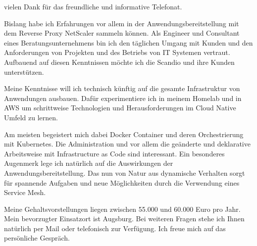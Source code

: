 \documentclass[11pt, a4paper]{awesome-cv} %
\begin{document}
\makecvheader %

\makelettertitle %


\begin{cvletter}



vielen Dank für das freundliche und informative Telefonat.

Bislang habe ich Erfahrungen vor allem in der Anwendungsbereitstellung mit dem Reverse Proxy NetScaler sammeln können. Als Engineer und Consultant eines Beratungsunternehmens bin ich den täglichen Umgang mit Kunden und den Anforderungen von Projekten und des Betriebs von IT Systemen vertraut. Aufbauend auf diesen Kenntnissen möchte ich die Scandio und ihre Kunden unterstützen.

Meine Kenntnisse will ich technisch künftig auf die gesamte Infrastruktur von Anwendungen ausbauen. Dafür experimentiere ich in meinem Homelab und in AWS um schrittweise Technologien und Herausforderungen im Cloud Native Umfeld zu lernen.

Am meisten begeistert mich dabei Docker Container und deren Orchestrierung mit Kubernetes. Die Administration und vor allem die geänderte und deklarative Arbeitsweise mit Infrastructure as Code sind interessant. 
Ein besonderes Augenmerk lege ich natürlich auf die Auswirkungen der Anwendungsbereitstellung. Das nun von Natur aus dynamische Verhalten sorgt für spannende Aufgaben und neue Möglichkeiten durch die Verwendung eines Service Mesh.




Meine Gehaltsvorstellungen liegen zwischen 55.000 und 60.000 Euro pro Jahr. Mein bevorzugter Einsatzort ist Augsburg. 
Bei weiteren Fragen stehe ich Ihnen natürlich per Mail oder telefonisch zur Verfügung. Ich freue mich auf das persönliche Gespräch.



\end{cvletter}


\makeletterclosing %
\end{document}
